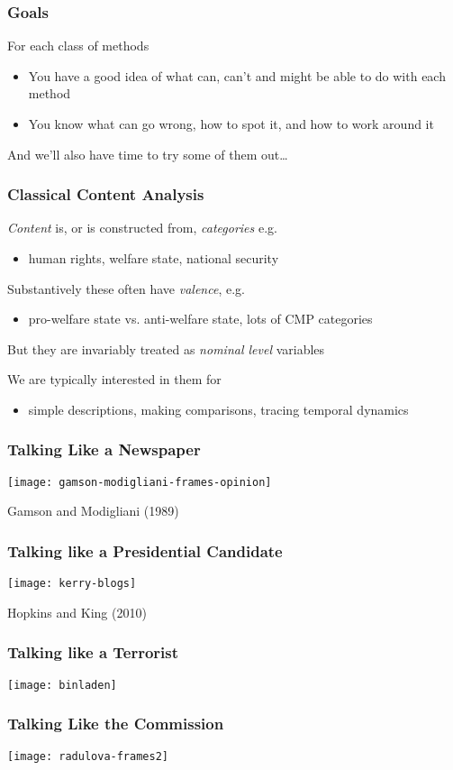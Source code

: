 \documentclass[11pt,compress,professionalfonts]{beamer}
\newcommand{\ita}{\begin{itemize}}
\newcommand{\itm}{\item[]}
\newcommand{\itz}{\end{itemize}}
\begin{document}
\begin{frame}[t,fragile]\frametitle{Goals}

For each class of methods
\ita
\itm You have a good idea of what can, can't and might be able to do with each method
\itm You know what can go wrong, how to spot it, and how to work around it
\itz

And we'll also have time to try some of them out\ldots

\end{frame}


\plain{}


\begin{frame}[t,fragile]\frametitle{Classical Content Analysis}

\textsl{Content} is, or is constructed from, \textsl{categories} e.g.
\ita
\itm human rights, welfare state, national security
\itz
Substantively these often have \textsl{valence}, e.g.
\ita
\itm pro-welfare state vs. anti-welfare state, lots of CMP categories
\itz
But they are invariably treated as \textsl{nominal level} variables

We are typically interested in them for
\ita
\itm simple descriptions, making comparisons, tracing temporal dynamics
\itz

\end{frame}
\begin{frame}[t,fragile]\frametitle{Talking Like a Newspaper}

\centerline{\texttt{[image: gamson-modigliani-frames-opinion]}}
Gamson and Modigliani (1989)


\end{frame}
\begin{frame}[t,fragile]\frametitle{Talking like a Presidential Candidate}

\centerline{\texttt{[image: kerry-blogs]}}
Hopkins and King (2010)

\end{frame}
\begin{frame}[t,fragile]\frametitle{Talking like a Terrorist}

\begin{center}
\texttt{[image: binladen]}
\end{center}

\end{frame}
\begin{frame}[t,fragile]\frametitle{Talking Like the Commission}

\centerline{\texttt{[image: radulova-frames2]}}


\end{frame}
\end{document}
